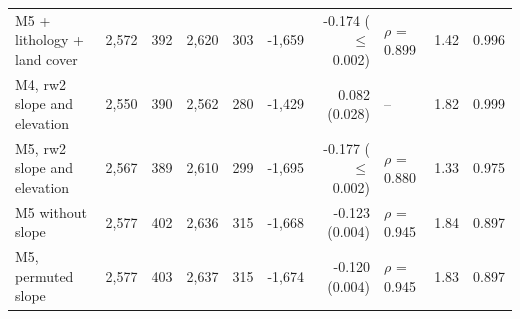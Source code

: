 \begin{table}[h]
\begin{tabular}{@{}lrrrrrrlrr@{}}
M5 + lithology + land cover & 2,572 & 392 & 2,620 & 303 & -1,659 & -0.174 ($\leq$0.002) & $\rho$ = 0.899 & 1.42 & 0.996 \\
M4, rw2 slope and elevation & 2,550 & 390 & 2,562 & 280 & -1,429 & 0.082 (0.028) & -- & 1.82 & 0.999 \\
M5, rw2 slope and elevation & 2,567 & 389 & 2,610 & 299 & -1,695 & -0.177 ($\leq$0.002) & $\rho$ = 0.880 & 1.33 & 0.975 \\
M5 without slope & 2,577 & 402 & 2,636 & 315 & -1,668 & -0.123 (0.004) & $\rho$ = 0.945 & 1.84 & 0.897 \\
M5, permuted slope & 2,577 & 403 & 2,637 & 315 & -1,674 & -0.120 (0.004) & $\rho$ = 0.945 & 1.83 & 0.897 \\
\bottomrule
\end{tabular}
\end{table}
